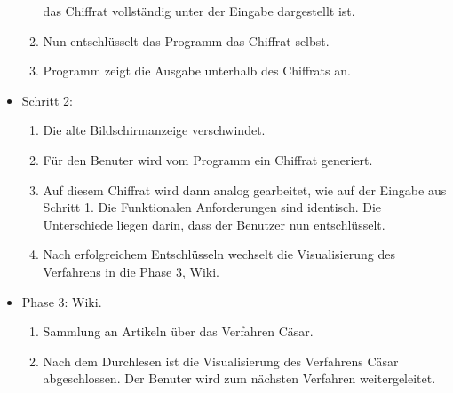 \documentclass{article}
\begin{document}
\begin{itemize}[label={}]
\begin{enumerate}
        das Chiffrat vollständig unter der Eingabe dargestellt ist.
  \item Nun entschlüsselt das Programm das Chiffrat selbst.
  \item Programm zeigt die Ausgabe unterhalb des Chiffrats an.
 \end{enumerate}
 \item Schritt 2:
 \begin{enumerate}
  \item Die alte Bildschirmanzeige verschwindet.
  \item Für den Benuter wird vom Programm ein Chiffrat generiert. 
  \item[] Auf diesem Chiffrat wird dann analog gearbeitet, wie auf der Eingabe aus Schritt 1. Die Funktionalen 
          Anforderungen sind identisch. Die Unterschiede liegen darin, dass der Benutzer nun entschlüsselt.
  \item Nach erfolgreichem Entschlüsseln wechselt die Visualisierung des Verfahrens in die Phase 3, 
        Wiki.
 \end{enumerate}
 \item Phase 3: Wiki.
  \begin{enumerate}
   \item Sammlung an Artikeln über das Verfahren Cäsar.
   \item Nach dem Durchlesen ist die Visualisierung des Verfahrens Cäsar abgeschlossen. 
         Der Benuter wird zum nächsten Verfahren weitergeleitet.
  \end{enumerate}
\end{itemize}
\end{document}

